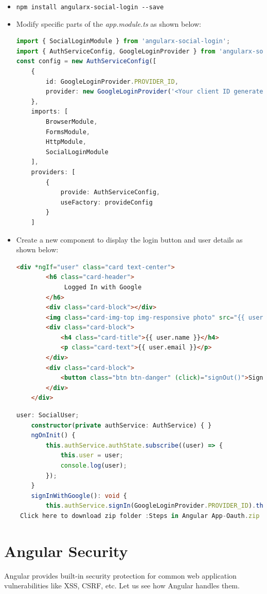 \documentclass{report}
\begin{document}
\begin{itemize}
	\item{\lstinline{npm install angularx-social-login --save}}
	\item{Modify specific parts of the \textit{app.module.ts} as shown below:}
		\begin{lstlisting}[language=Typescript, caption=app.module.ts]
		import { SocialLoginModule } from 'angularx-social-login';
import { AuthServiceConfig, GoogleLoginProvider } from 'angularx-social-login';
const config = new AuthServiceConfig([
	{
		id: GoogleLoginProvider.PROVIDER_ID,
		provider: new GoogleLoginProvider('<Your client ID generated by Google>')
	},
	imports: [
		BrowserModule,
		FormsModule,
		HttpModule,
		SocialLoginModule
	],
	providers: [
		{
			provide: AuthServiceConfig,
			useFactory: provideConfig
		}
	]
		\end{lstlisting}

	\item{Create a new component to display the login button and user details as shown below:}
		\begin{lstlisting}[language=HTML, caption=HTML]
		<div *ngIf="user" class="card text-center">
		<h6 class="card-header">
			 Logged In with Google
		</h6>
		<div class="card-block"></div>
		<img class="card-img-top img-responsive photo" src="{{ user.photoUrl }}">
		<div class="card-block">
			<h4 class="card-title">{{ user.name }}</h4>
			<p class="card-text">{{ user.email }}</p>
		</div>
		<div class="card-block">
			<button class="btn btn-danger" (click)="signOut()">Sign out</button>
		</div>
	</div>
	\end{lstlisting}

		\begin{lstlisting}[language=Typescript, caption=TS]
		user: SocialUser;
	constructor(private authService: AuthService) { }
	ngOnInit() {
		this.authService.authState.subscribe((user) => {
			this.user = user;
			console.log(user);
		});
	}
	signInWithGoogle(): void {
		this.authService.signIn(GoogleLoginProvider.PROVIDER_ID).then(x => console.log(x));
 Click here to download zip folder :Steps in Angular App-Oauth.zip
		\end{lstlisting}
\end{itemize}
\chapter{Angular Security}
Angular provides built-in security protection for common web application vulnerabilities like XSS, CSRF, etc. Let us see how Angular handles them.
\end{document}
